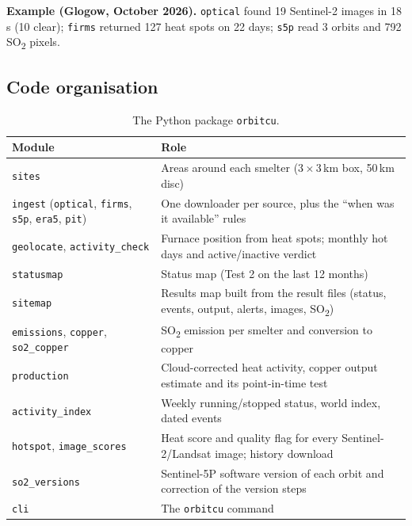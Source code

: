 \documentclass[10pt,a4paper]{article}
\newcommand{\SOtwo}{SO\textsubscript{2}}
\newcommand{\code}[1]{\texttt{\small #1}}
\begin{document}
\textbf{Example (Glogow, October 2026).} \code{optical} found 19 Sentinel-2 images in 18\,s (10 clear); \code{firms} returned 127 heat spots on 22 days; \code{s5p} read 3 orbits and 792 \SOtwo{} pixels.

\subsection*{Code organisation}
\begin{table}[H]
\centering\small
\begin{tabularx}{\textwidth}{@{}l X@{}}
\toprule
\textbf{Module} & \textbf{Role}\\
\midrule
\code{sites} & Areas around each smelter (3\,$\times$\,3\,km box, 50\,km disc)\\
\code{ingest} (\code{optical}, \code{firms}, \code{s5p}, \code{era5}, \code{pit}) & One downloader per source, plus the ``when was it available'' rules\\
\code{geolocate}, \code{activity\_check} & Furnace position from heat spots; monthly hot days and active/inactive verdict\\
\code{statusmap} & Status map (Test 2 on the last 12 months)\\
\code{sitemap} & Results map built from the result files (status, events, output, alerts, images, \SOtwo{})\\
\code{emissions}, \code{copper}, \code{so2\_copper} & \SOtwo{} emission per smelter and conversion to copper\\
\code{production} & Cloud-corrected heat activity, copper output estimate and its point-in-time test\\
\code{activity\_index} & Weekly running/stopped status, world index, dated events\\
\code{hotspot}, \code{image\_scores} & Heat score and quality flag for every Sentinel-2/Landsat image; history download\\
\code{so2\_versions} & Sentinel-5P software version of each orbit and correction of the version steps\\
\code{cli} & The \code{orbitcu} command\\
\bottomrule
\end{tabularx}
\caption{The Python package \code{orbitcu}.}
\end{table}

\end{document}
